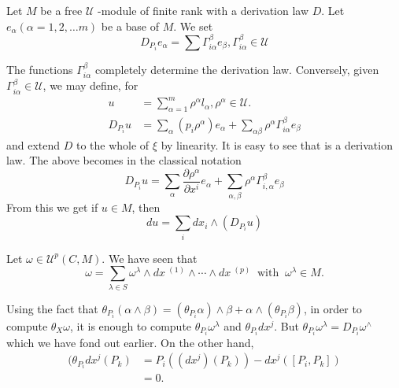 Let $M$ be a free $ \mathscr{U} $ -module of finite rank with  a
derivation law $D$. Let $ e_\alpha ( \alpha = 1,2, \ldots m )$  be a
base of $M$. We set  
$$
D_{P_i} e_\alpha  = \sum \Gamma^\beta_{i \alpha} e_\beta,
\Gamma^\beta_{i \alpha}  \in \mathscr{U}  
$$

The functions $ \Gamma^\beta_{i \alpha} $ completely determine the
derivation law. Conversely, given $ \Gamma^\beta_{i \alpha} \in
  \mathscr{U}$, we may define, for  
\begin{align*}
  u & = \sum^{m}_{\alpha=1} \rho^\alpha  l_\alpha, \rho^\alpha \in \mathscr{U}. \\
  D_{P_i} u & = \sum_{\alpha} ( p_i \rho^\alpha ) e_\alpha +
  \sum_{\alpha \beta}\rho^\alpha \Gamma^\beta_{i \alpha} e_\beta
\end{align*}
and extend $D$ to the whole of $ \xi $ by linearity. It is easy to see
that is a derivation law. The above becomes in the classical notation\pageoriginale 
$$
D_{P_i} u = \sum_{\alpha} \frac{\partial \rho^\alpha}{\partial x^i}
e_\alpha  + \sum_{\alpha,\beta} \rho^\alpha \Gamma^\beta_{i, \alpha}
e_\beta  
$$
From this we get if $ u \in M $, then 
$$
du = \sum_{i} dx_i \wedge ( D_{P_i} u ) 
$$

Let $ \omega \in \mathscr{U}^p ( C, M ) $. We have seen that 
$$
\omega = \sum_{\lambda \in S} \omega^\lambda \wedge dx ~{}^{(1)} \wedge \cdots
\wedge dx ~{}^{(p)} ~\text{ with }~ \omega^\lambda \in M. 
$$

Using the fact that $ \theta_{P_i}(\alpha \wedge \beta ) =
(\theta_{P_i} \alpha ) \wedge \beta  + \alpha \wedge  ( \theta_{P_i}
\beta ) $, in order to  compute $ \theta_X \omega $, it is enough to
compute $ \theta_{P_i} \omega^\lambda $  and $ \theta_{P_i} dx^j
$. But $ \theta_{P_i} \omega^\lambda = D_{P_i} \omega^\wedge $ which
we have fond out earlier.  On the other hand, 
\begin{align*}
  (\theta_{P_{i}} dx^j (P_k) &= P_i (( dx^j ) (P_k )) - dx^j ([ P_i , P_k ])\\
  &= 0. 
\end{align*}
